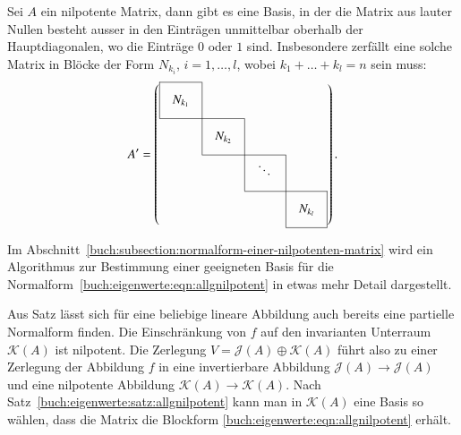 \begin{satz}
\label{buch:eigenwerte:satz:allgnilpotent}
Sei $A$ ein nilpotente Matrix, dann gibt es eine Basis, in der die Matrix
aus lauter Nullen besteht ausser in den Einträgen unmittelbar oberhalb der 
Hauptdiagonalen, wo die Einträge $0$ oder $1$ sind.
Insbesondere zerfällt eine solche Matrix in Blöcke der Form $N_{k_i}$,
$i=1,\dots,l$,
wobei $k_1+\dots+k_l=n$ sein muss:
\begin{equation}
\def\temp#1{\multicolumn{1}{|c}{\raisebox{0pt}[17pt][12pt]{\phantom{x}$#1\mathstrut$}\phantom{x}}}
A'
=\left(
\begin{array}{cccc}
\cline{1-1}
\temp{N_{k_1}} &\multicolumn{1}{|c}{}&        &           \\
\cline{1-2}
          &\temp{N_{k_2}}&\multicolumn{1}{|c}{}&           \\
\cline{2-3}
          &           &\temp{\ddots}&\multicolumn{1}{|c}{}\\
\cline{3-4}
          &           &        &\multicolumn{1}{|c|}{\raisebox{0pt}[17pt][12pt]{\phantom{x}$N_{k_l}$}\phantom{x}}\\
\cline{4-4}
\end{array}
\right).
\label{buch:eigenwerte:eqn:allgnilpotent}
\end{equation}
\end{satz}

Im Abschnitt~\ref{buch:subsection:normalform-einer-nilpotenten-matrix}
wird ein Algorithmus zur Bestimmung einer geeigneten Basis für die
Normalform~\eqref{buch:eigenwerte:eqn:allgnilpotent} in etwas mehr
Detail dargestellt.

Aus Satz lässt sich für eine beliebige lineare Abbildung auch bereits eine
partielle Normalform finden.
Die Einschränkung von $f$ auf den invarianten Unterraum $\mathcal{K}(A)$
ist nilpotent.
Die Zerlegung $V=\mathcal{J}(A)\oplus \mathcal{K}(A)$ führt also zu einer
Zerlegung der Abbildung $f$ in eine invertierbare Abbildung
$\mathcal{J}(A)\to\mathcal{J}(A)$ und eine
nilpotente Abbildung $\mathcal{K}(A)\to\mathcal{K}(A)$.
Nach Satz~\ref{buch:eigenwerte:satz:allgnilpotent} kann man in
$\mathcal{K}(A)$ eine Basis so wählen, dass die Matrix die Blockform
\eqref{buch:eigenwerte:eqn:allgnilpotent} erhält.


